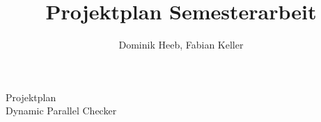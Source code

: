 \documentclass[10pt,a4paper]{article}
\author{Dominik Heeb, Fabian Keller}
\title{Projektplan Semesterarbeit}
\begin{document}
\begin{titlepage}
	\begin{Huge}
	\begin{center}
	Projektplan \\Dynamic Parallel Checker
	\end{center}
	\end{Huge}
	
	
\end{titlepage}
\end{document}
